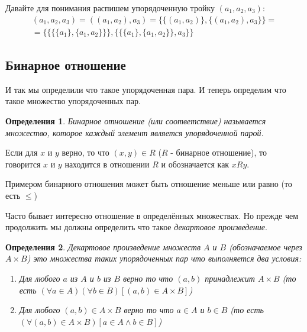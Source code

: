 \documentclass[a4paper, 16pt, oneside]{book}
\newtheorem{Definition}{Определения}[theorem]
\begin{document}
\par Давайте для понимания распишем упорядоченную тройку \((a_1, a_2, a_3)\):
\begin{multline*}
    (a_1, a_2, a_3) = ((a_1, a_2), a_3) = \Big\{\big\{(a_1, a_2)\big\}, \big\{(a_1, a_2), a_3\big\}\Big\} = \\ = \Bigg\{\bigg\{\Big\{\{a_1\}, \big\{a_1, a_2\big\}\Big\}\bigg\}, \bigg\{\Big\{\big\{a_1\big\}, \big\{a_1, a_2\big\}\Big\}, a_3\bigg\}\Bigg\}
\end{multline*}

\subsection{Бинарное отношение}

\par И так мы определили что такое упорядоченная пара. И теперь определим что такое множество упорядоченных пар.

\begin{Definition}
    \label{definiton:binary_relation}
    Бинарное отношение (или соответствие) называется множество, которое каждый элемент является упорядоченной парой.
\end{Definition}

\par Если для \(x\) и \(y\) верно, то что \((x, y) \in R\) (\(R\) - бинарное отношение), то говорится \(x\) и \(y\) находится в отношении \(R\)
и обозначается как \(xRy\).

\par Примером бинарного отношения может быть отношение меньше или равно (то есть \(\le\))

\par Часто бывает интересно отношение в определённых множествах. Но прежде чем продолжить мы должны определить что такое \textit{декартовое произведение}.

\begin{Definition}
    \label{definiton:cartesian_product}
    Декартовое произведение множеств \(A\) и \(B\) (обозначаемое через \(A \times B\)) это множества таких упорядоченных пар что выполняется два условия:
    \begin{enumerate}
        \item Для любого \(a\) из \(A\) и \(b\) из \(B\) верно то что \((a, b)\) принадлежит \(A \times B\)
            (то есть \((\forall a \in A)(\forall b \in B)[(a, b) \in A \times B]\))
        \item Для любого \((a, b) \in A \times B\) верно то что \(a \in A\) и \(b \in B\)
            (то есть \((\forall (a, b) \in A \times B)[a \in A \land b \in B]\))
    \end{enumerate}
\end{Definition}
\end{document}

